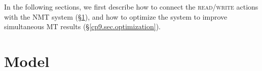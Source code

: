 
In the following sections, we first describe how to connect the \textsc{read}/\textsc{write} actions with the NMT system (\S\ref{cp9.sec.framework}), and how to optimize the system to improve simultaneous MT results (\S\ref{cp9.sec.optimization}).



\section{Model}
\label{cp9.sec.framework}

